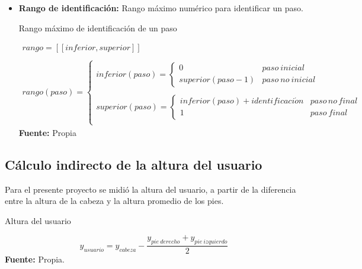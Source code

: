 \begin{itemize}
\item \textbf{Rango de identificaci\'on:} Rango m\'aximo num\'erico para identificar un paso.
\begin{formula}[H]
	\centering
	\caption{Rango m\'aximo de identificaci\'on de un paso}
	\label{frm:idenStep}
	\begin{equation}
\begin{matrix}
rango = [[inferior,superior]] \\
\\
rango(paso)=\left\{\begin{matrix}
inferior(paso)= \left\{\begin{matrix}
0 & paso\: inicial\\ 
superior(paso-1) & paso\: no\: inicial
\end{matrix}\right.\\ 
\\
superior(paso)= \left\{\begin{matrix}
inferior(paso)+identificaci\acute{o}n & paso\, no\, final\\ 
1 & paso\: final

\end{matrix}\right.\\ 
\end{matrix}\right.
\end{matrix}
	\end{equation}
	\textbf{Fuente:} Propia
\end{formula} 
\end{itemize}
\subsection{C\'alculo indirecto de la altura del usuario} \label{dis:height}
Para el presente proyecto se midi\'o la altura del usuario, a partir de la diferencia entre la altura de la cabeza y la altura promedio de los pies.
	\begin{formula}[H]
	\centering
	\caption{Altura del usuario}
	\label{frm:alturaUser}
	\begin{equation}
y_{usuario}=y_{cabeza}-\frac{y_{pie \: derecho}+y_{pie \: izquierdo}}{2}
	\end{equation}
			\textbf{Fuente:} Propia.
\end{formula} 
